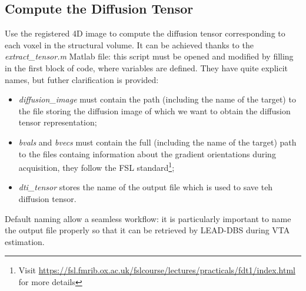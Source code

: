 \documentclass[a4paper,11pt]{article}
\begin{document}
\subsection{Compute the Diffusion Tensor}

Use the registered 4D image to compute the diffusion tensor corresponding to each voxel in the structural volume. It can be achieved thanks to the \emph{extract\_tensor.m} Matlab file: this script must be opened and modified by filling in the first block of code, where variables are defined. They have quite explicit names, but futher clarification is provided:
\begin{itemize}
\item \emph{diffusion\_image} must contain the path (including the name of the target) to the file storing the diffusion image of which we want to obtain the diffusion tensor representation;
\item \emph{bvals} and \emph{bvecs} must contain the full (including the name of the target) path to the files containg information about the gradient orientations during acquisition, they follow the FSL standard\footnote{Visit \url{https://fsl.fmrib.ox.ac.uk/fslcourse/lectures/practicals/fdt1/index.html} for more details};
\item \emph{dti\_tensor} stores the name of the output file which is used to save teh diffusion tensor.
\end{itemize}
Default naming allow a seamless workflow: it is particularly important to name the output file properly so that it can be retrieved by LEAD-DBS during VTA estimation.

\end{document}
